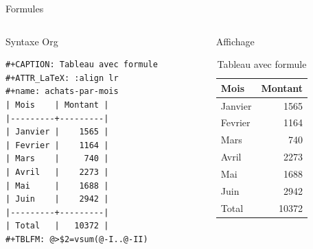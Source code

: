 \documentclass[presentation,t]{beamer}
\begin{document}
\begin{frame}[fragile,label={sec:orgb3c7327}]{Formules}
 \begin{columns}
\begin{column}{0.55\columnwidth}
Syntaxe Org

\lstset{language=org,label=orga0b2f48,caption= ,captionpos=b,numbers=none}
\begin{lstlisting}
#+CAPTION: Tableau avec formule
#+ATTR_LaTeX: :align lr
#+name: achats-par-mois
| Mois    | Montant |
|---------+---------|
| Janvier |    1565 |
| Fevrier |    1164 |
| Mars    |     740 |
| Avril   |    2273 |
| Mai     |    1688 |
| Juin    |    2942 |
|---------+---------|
| Total   |   10372 |
#+TBLFM: @>$2=vsum(@-I..@-II)
\end{lstlisting}
\end{column}

\begin{column}{0.42\columnwidth}
Affichage

\begin{mdframed}
\begin{table}[!htbp]
\caption{\label{achats-par-mois}Tableau avec formule}
\centering
\begin{tabular}{lr}
Mois & Montant\\
\hline
Janvier & 1565\\
Fevrier & 1164\\
Mars & 740\\
Avril & 2273\\
Mai & 1688\\
Juin & 2942\\
\hline
Total & 10372\\
\end{tabular}
\end{table}

\end{mdframed}
\end{column}
\end{columns}
\end{frame}
\end{document}
